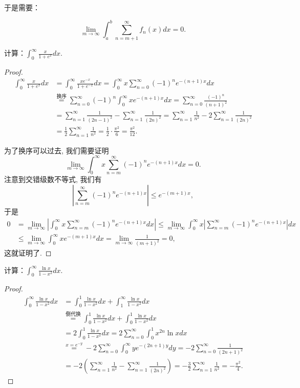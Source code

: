 \documentclass[lang=cn,10pt,thmcnt=section]{elegantbook}
\begin{document}
于是需要：

\[\lim_{m \to \infty} \int_{a}^{b} \sum_{n=m+1}^{\infty} f_n(x) dx = 0.\]

\begin{example}
计算：\(\int_{0}^{\infty} \frac{x}{1+e^x} dx\).
\end{example}
\begin{proof}
	\begin{align*}
		\int_0^\infty \frac{x}{1+e^x} dx &= \int_0^\infty \frac{xe^{-x}}{1+e^{-x}} dx = \int_0^\infty x \sum_{n=0}^{\infty} (-1)^n e^{-(n+1)x} dx \\
		&\stackrel{换序}{=} \sum_{n=0}^{\infty} (-1)^n \int_0^\infty x e^{-(n+1)x} dx = \sum_{n=0}^{\infty} \frac{(-1)^n}{(n+1)^2} \\
		&= \sum_{n=1}^{\infty} \frac{1}{(2n-1)^2} - \sum_{n=1}^{\infty} \frac{1}{(2n)^2} = \sum_{n=1}^{\infty} \frac{1}{n^2} - 2\sum_{n=1}^{\infty} \frac{1}{(2n)^2} \\
		&= \frac{1}{2} \sum_{n=1}^{\infty} \frac{1}{n^2} = \frac{1}{2} \cdot \frac{\pi^2}{6} = \frac{\pi^2}{12}.
	\end{align*}
	
	为了换序可以过去, 我们需要证明
	\[ \lim_{m\to\infty} \int_0^\infty x \sum_{n=m}^{\infty} (-1)^n e^{-(n+1)x} dx = 0. \]
	注意到交错级数不等式, 我们有
	\[ \left| \sum_{n=m}^{\infty} (-1)^n e^{-(n+1)x} \right| \le e^{-(m+1)x}, \]
	于是
	\begin{align*}
		0 &= \lim_{m\to\infty} \left| \int_0^\infty x \sum_{n=m}^{\infty} (-1)^n e^{-(n+1)x} dx \right| \le \lim_{m\to\infty} \int_0^\infty x \left| \sum_{n=m}^{\infty} (-1)^n e^{-(n+1)x} \right| dx \\
		&\le \lim_{m\to\infty} \int_0^\infty x e^{-(m+1)x} dx = \lim_{m\to\infty} \frac{1}{(m+1)^2} = 0,
	\end{align*}
	这就证明了.
\end{proof}
\begin{example}
计算：\(\int_{0}^{\infty} \frac{\ln x}{1-x^2} dx\).
\end{example}
\begin{proof}
	\begin{align*}
		\int_0^\infty \frac{\ln x}{1-x^2} dx &= \int_0^1 \frac{\ln x}{1-x^2} dx + \int_1^\infty \frac{\ln x}{1-x^2} dx \\
		&\stackrel{倒代换}{=} \int_0^1 \frac{\ln x}{1-x^2} dx + \int_0^1 \frac{\ln x}{1-x^2} dx \\
		&= 2 \int_0^1 \frac{\ln x}{1-x^2} dx = 2 \sum_{n=0}^{\infty} \int_0^1 x^{2n} \ln x dx \\
		&\stackrel{x=e^{-y}}{=} -2 \sum_{n=0}^{\infty} \int_0^\infty y e^{-(2n+1)y} dy = -2 \sum_{n=0}^{\infty} \frac{1}{(2n+1)^2} \\
		&= -2 \left( \sum_{n=1}^{\infty} \frac{1}{n^2} - \sum_{n=1}^{\infty} \frac{1}{(2n)^2} \right) = -\frac{3}{2} \sum_{n=1}^{\infty} \frac{1}{n^2} = -\frac{\pi^2}{4}.
	\end{align*}
\end{proof}
\end{document}
